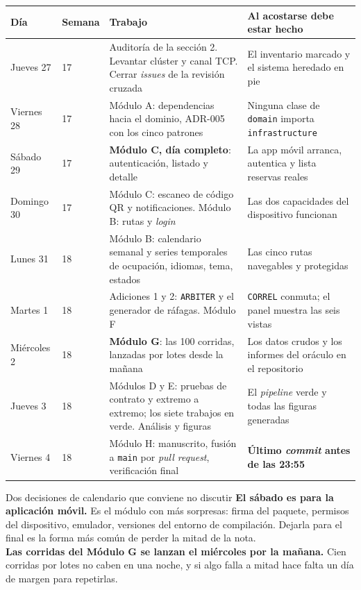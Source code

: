\documentclass[11pt,a4paper]{article}
\begin{document}
\begin{center}
	\small
	\begin{longtable}{@{}p{2.6cm}p{1.5cm}p{5.2cm}p{5.0cm}@{}}
		\toprule
		\textbf{Día} & \textbf{Semana} & \textbf{Trabajo} & \textbf{Al acostarse debe estar hecho} \\
		\midrule
		\endhead
		Jueves 27 & 17 & Auditoría de la sección 2. Levantar clúster y canal TCP. Cerrar \emph{issues} de la revisión cruzada & El inventario marcado y el sistema heredado en pie \\
		\addlinespace
		Viernes 28 & 17 & Módulo A: dependencias hacia el dominio, ADR-005 con los cinco patrones & Ninguna clase de \texttt{domain} importa \texttt{infrastructure} \\
		\addlinespace
		Sábado 29 & 17 & \textbf{Módulo C, día completo}: autenticación, listado y detalle & La app móvil arranca, autentica y lista reservas reales \\
		\addlinespace
		Domingo 30 & 17 & Módulo C: escaneo de código QR y notificaciones. Módulo B: rutas y \emph{login} & Las dos capacidades del dispositivo funcionan \\
		\addlinespace
		Lunes 31 & 18 & Módulo B: calendario semanal y series temporales de ocupación, idiomas, tema, estados & Las cinco rutas navegables y protegidas \\
		\addlinespace
		Martes 1 & 18 & Adiciones 1 y 2: \texttt{ARBITER} y el generador de ráfagas. Módulo F & \texttt{CORREL} conmuta; el panel muestra las seis vistas \\
		\addlinespace
		Miércoles 2 & 18 & \textbf{Módulo G}: las 100 corridas, lanzadas por lotes desde la mañana & Los datos crudos y los informes del oráculo en el repositorio \\
		\addlinespace
		Jueves 3 & 18 & Módulos D y E: pruebas de contrato y extremo a extremo; los siete trabajos en verde. Análisis y figuras & El \emph{pipeline} verde y todas las figuras generadas \\
		\addlinespace
		Viernes 4 & 18 & Módulo H: manuscrito, fusión a \texttt{main} por \emph{pull request}, verificación final & \textbf{Último \emph{commit} antes de las 23:55} \\
		\bottomrule
	\end{longtable}
\end{center}

\begin{avisoBox}{Dos decisiones de calendario que conviene no discutir}
	\textbf{El sábado es para la aplicación móvil.} Es el módulo con más sorpresas: firma del paquete, permisos del dispositivo, emulador, versiones del entorno de compilación. Dejarla para el final es la forma más común de perder la mitad de la nota.\\[5pt]
	\textbf{Las corridas del Módulo G se lanzan el miércoles por la mañana.} Cien corridas por lotes no caben en una noche, y si algo falla a mitad hace falta un día de margen para repetirlas.
\end{avisoBox}
\end{document}
